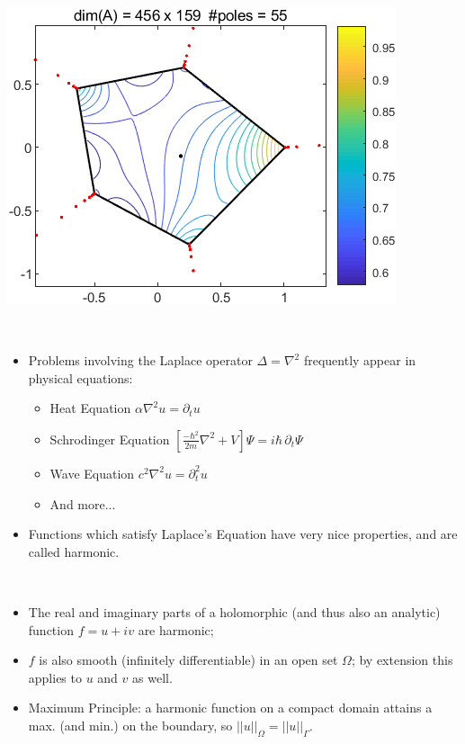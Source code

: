\documentclass{seminar}
\begin{document}
\begin{slide}
\begin{multicols}{3}
\includegraphics[scale=.4]{./PNG/randpoly1}
\end{multicols}
\end{slide} %




\begin{slide} %
{} \small \\

\begin{itemize}
	\item Problems involving the Laplace operator $\Delta={\nabla}^2$ frequently appear in physical equations:
	\begin{itemize}
		\item Heat Equation
		$\alpha {\nabla}^2 u={\partial}_t u$
		\item Schrodinger Equation
		$\left[ \frac{-{\hbar}^2}{2m}{\nabla}^2 + V \right]\Psi=i \hbar \, \partial_t \Psi$
		\item Wave Equation
		$c^2 {\nabla}^2 u={\partial}_t^2 u$
		\item And more...
	\end{itemize}
	\item Functions which satisfy Laplace's Equation have very nice properties, and are called harmonic.
	
\end{itemize}
\end{slide} %




\begin{slide} %
{} \small \\

\begin{itemize}
	\item The real and imaginary parts of a holomorphic (and thus also an analytic) function $f=u+iv$ are harmonic;
	\item $f$ is also smooth (infinitely differentiable) in an open set $\Omega$; by extension this applies to $u$ and $v$ as well.
	\item Maximum Principle: a harmonic function on a compact domain attains a max. (and min.) on the boundary, so $||u||_{\Omega}=||u||_{\Gamma}$.
\end{itemize}
\end{slide} %
\end{document}

